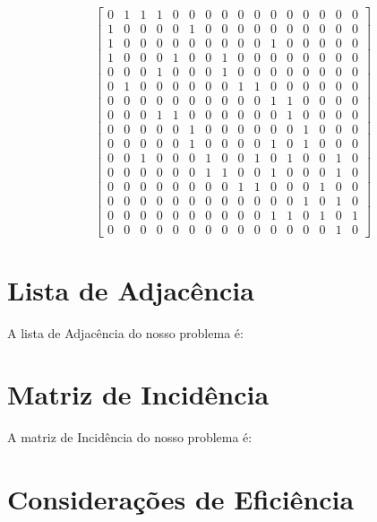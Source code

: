 \documentclass[
12pt,
a4paper,
semrecuonosumario,
sumario = abnt-6027-2012]{report}
\begin{document}
	\[
	\begin{bmatrix}
		0 & 1 & 1 & 1 & 0 & 0 & 0 & 0 & 0 & 0 & 0 & 0 & 0 & 0 & 0 & 0\\%
		1 & 0 & 0 & 0 & 0 & 1 & 0 & 0 & 0 & 0 & 0 & 0 & 0 & 0 & 0 & 0\\%
		1 & 0 & 0 & 0 & 0 & 0 & 0 & 0 & 0 & 0 & 1 & 0 & 0 & 0 & 0 & 0\\%
		1 & 0 & 0 & 0 & 1 & 0 & 0 & 1 & 0 & 0 & 0 & 0 & 0 & 0 & 0 & 0\\%
		0 & 0 & 0 & 1 & 0 & 0 & 0 & 1 & 0 & 0 & 0 & 0 & 0 & 0 & 0 & 0\\%
		0 & 1 & 0 & 0 & 0 & 0 & 0 & 0 & 1 & 1 & 0 & 0 & 0 & 0 & 0 & 0\\%
		0 & 0 & 0 & 0 & 0 & 0 & 0 & 0 & 0 & 0 & 1 & 1 & 0 & 0 & 0 & 0\\%
		0 & 0 & 0 & 1 & 1 & 0 & 0 & 0 & 0 & 0 & 0 & 1 & 0 & 0 & 0 & 0\\%
		0 & 0 & 0 & 0 & 0 & 1 & 0 & 0 & 0 & 0 & 0 & 0 & 1 & 0 & 0 & 0\\%
		0 & 0 & 0 & 0 & 0 & 1 & 0 & 0 & 0 & 0 & 1 & 0 & 1 & 0 & 0 & 0\\%
		0 & 0 & 1 & 0 & 0 & 0 & 1 & 0 & 0 & 1 & 0 & 1 & 0 & 0 & 1 & 0\\%
		0 & 0 & 0 & 0 & 0 & 0 & 1 & 1 & 0 & 0 & 1 & 0 & 0 & 0 & 1 & 0\\%
		0 & 0 & 0 & 0 & 0 & 0 & 0 & 0 & 1 & 1 & 0 & 0 & 0 & 1 & 0 & 0\\%
		0 & 0 & 0 & 0 & 0 & 0 & 0 & 0 & 0 & 0 & 0 & 0 & 1 & 0 & 1 & 0\\%
		0 & 0 & 0 & 0 & 0 & 0 & 0 & 0 & 0 & 0 & 1 & 1 & 0 & 1 & 0 & 1\\%
		0 & 0 & 0 & 0 & 0 & 0 & 0 & 0 & 0 & 0 & 0 & 0 & 0 & 0 & 1 & 0 %
	\end{bmatrix}
	\]


	\section{Lista de Adjacência}\label{sec:lista}

	A lista de Adjacência do nosso problema é:

	\section{Matriz de Incidência}\label{sec:incidencia}

	A matriz de Incidência do nosso problema é:

	\section{Considerações de Eficiência}\label{sec:eficienciaRepresentacao}
\end{document}
